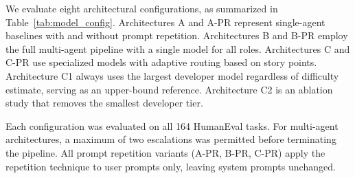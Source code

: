 We evaluate eight architectural configurations, as summarized in Table~\ref{tab:model_config}. Architectures A and A-PR represent single-agent baselines with and without prompt repetition. Architectures B and B-PR employ the full multi-agent pipeline with a single model for all roles. Architectures C and C-PR use specialized models with adaptive routing based on story points. Architecture C1 always uses the largest developer model regardless of difficulty estimate, serving as an upper-bound reference. Architecture C2 is an ablation study that removes the smallest developer tier.

Each configuration was evaluated on all 164 HumanEval tasks. For multi-agent architectures, a maximum of two escalations was permitted before terminating the pipeline. All prompt repetition variants (A-PR, B-PR, C-PR) apply the repetition technique to user prompts only, leaving system prompts unchanged.
